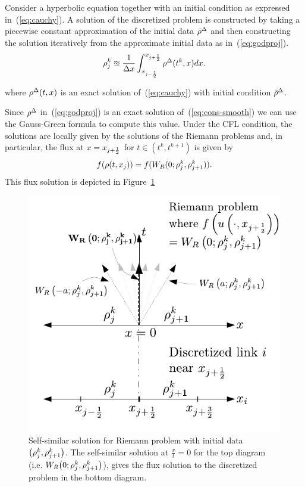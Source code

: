 Consider a hyperbolic equation together with an initial condition
as expressed in~(\ref{eq:cauchy}). A solution of the discretized
problem is constructed by taking a piecewise constant approximation
of the initial data $\bar{\rho}^{\Delta}$ and then constructing
the solution iteratively from the approximate initial data as in~(\ref{eq:godproj}).
\begin{equation}
\rho_{j}^{k}\approxeq\dfrac{1}{\Delta x}\int_{x_{j-\frac{1}{2}}}^{x_{j+\frac{1}{2}}}\rho^{\Delta}(t^{k},x)dx.\label{eq:godproj}
\end{equation}


where $\cvar^{\Delta}\left(t,x\right)$ is an exact solution of~(\ref{eq:cauchy})
with initial condition $\bar{\rho}^{\Delta}$.

Since $\rho^{\Delta}$ in~(\ref{eq:godproj}) is an exact solution
of~(\ref{eq:cons-smooth}) we can use the Gauss-Green formula to
compute this value. Under the CFL condition, the solutions are locally
given by the solutions of the Riemann problems and, in particular,
the flux at $x=x_{j+\frac{1}{2}}$ for $t\in(t^{k},t^{k+1})$
is given by 
\[
f(\rho(t,x_{j}))=f(W_{R}(0;\rho_{j}^{k},\rho_{j+1}^{k})).
\]
This flux solution is depicted in Figure~\ref{fig:Self-similar-solution-for}
\begin{figure}
\begin{centering}
\includegraphics[width=0.5\columnwidth]{figs-gen/dx-to-riemann}
\par\end{centering}

\caption{Self-similar solution for Riemann problem with initial data $\left(\discrete{\xind}{\tind},\discrete{\xind+1}{\tind}\right)$.
The self-similar solution at $\frac{x}{t}=0$ for the top diagram
(i.e. $\ss 0{\discrete{\xind}{\tind}}{\discrete{\xind+1}{\tind}}$),
gives the flux solution to the discretized problem in the bottom diagram.\label{fig:Self-similar-solution-for}}
\end{figure}
